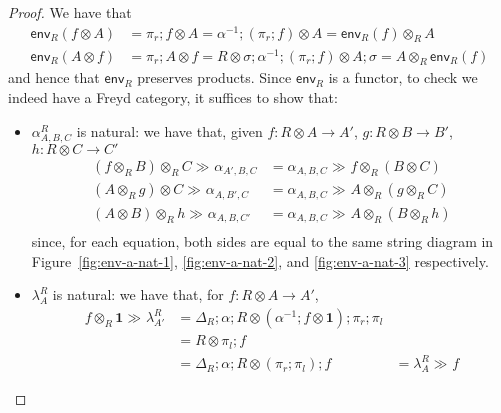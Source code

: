\documentclass[acmsmall,screen,review]{acmart}
\newcommand{\mb}[1]{\ensuremath{\mathbf{#1}}}
\newcommand{\ms}[1]{\ensuremath{\mathsf{#1}}}
\newcommand{\dmor}[1]{{\Delta}_{#1}}
\newcommand{\rseq}[3]{#2 \gg_{#1} #3}
\newcommand{\toenv}[2]{\ms{env}_{#1}(#2)}
\begin{document}
\begin{proof}
  We have that
  \begin{equation}
    \begin{aligned}
    \toenv{R}{f \otimes A} &= \pi_r ; f \otimes A = \alpha^{-1} ; (\pi_r ; f) \otimes A 
                            = \toenv{R}{f} \otimes_R A \\
    \toenv{R}{A \otimes f} &= \pi_r ; A \otimes f 
                            = R \otimes \sigma ; \alpha^{-1} ; (\pi_r ; f) \otimes A ; \sigma
                            = A \otimes_R \toenv{R}{f}
    \end{aligned} 
  \end{equation}
  and hence that $\ms{env}_R$ preserves products. Since $\ms{env}_R$ is a functor, to check we
  indeed have a Freyd category, it suffices to show that:
  \begin{itemize}
    \item $\alpha^R_{A, B, C}$ is natural: we have that, given 
    $f: R \otimes A \to A'$, $g : R \otimes B \to B'$, $h : R \otimes C \to C'$
    \begin{align}
      \rseq{}{(f \otimes_R B) \otimes_R C}{\alpha_{A', B, C}} 
        &= \rseq{}{\alpha_{A, B, C}}{f \otimes_R (B \otimes C)} \label{eqn:env-a-nat-1} \\
      \rseq{}{(A \otimes_R g) \otimes C}{\alpha_{A, B', C}}
        &= \rseq{}{\alpha_{A, B, C}}{A \otimes_R (g \otimes_R C)} \label{eqn:env-a-nat-2} \\
      \rseq{}{(A \otimes B) \otimes_R h}{\alpha_{A, B, C'}}
        &= \rseq{}{\alpha_{A, B, C}}{A \otimes_R (B \otimes_R h)} \label{eqn:env-a-nat-3} \\
    \end{align}
    since, for each equation, both sides are equal to the same string diagram in
    Figure~\ref{fig:env-a-nat-1}, \ref{fig:env-a-nat-2}, and \ref{fig:env-a-nat-3}
    respectively.
    \item $\lambda^R_{A}$ is natural: we have that, for $f : R \otimes A \to A'$,
    \begin{equation}
      \begin{aligned}
      \rseq{}{f \otimes_R \mb{1}}{\lambda^R_{A'}}
      &= \dmor{R} ; \alpha ; R \otimes (\alpha^{-1} ; f \otimes \mb{1}) ; \pi_r ; \pi_l \\
      &= R \otimes \pi_l ; f \\
      &= \dmor{R} ; \alpha ; R \otimes (\pi_r ; \pi_l) ; f
      &= \rseq{}{\lambda^R_{A}}{f}
      \end{aligned}

\end{equation}
\end{itemize}
\end{proof}
\end{document}
